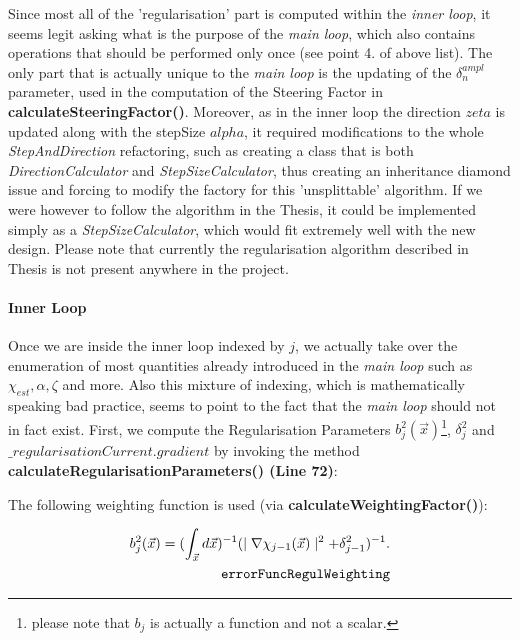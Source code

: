 \documentclass[10pt,a4paper]{article}
\begin{document}
{
Since most all of the 'regularisation' part is computed within the \textit{inner loop}, it seems legit asking what is the purpose of the \textit{main loop}, which also contains operations that should be performed only once (see point 4. of above list).
The only part that is actually unique to the \textit{main loop} is the updating of the $\delta^{ampl}_n$ parameter, used in the computation of the Steering Factor in \textbf{calculateSteeringFactor()}.
\newline
Moreover, as in the inner loop the direction $zeta$ is updated along with the stepSize $alpha$, it required modifications to the whole \textit{StepAndDirection} refactoring, such as creating a class that is both \textit{DirectionCalculator} and \textit{StepSizeCalculator}, thus creating an inheritance diamond issue and forcing to modify the factory for this 'unsplittable' algorithm.
If we were however to follow the algorithm in the Thesis, it could be implemented simply as a \textit{StepSizeCalculator}, which would fit extremely well with the new design.
Please note that currently the regularisation algorithm described in Thesis is not present anywhere in the project.
\newline
}

{
\paragraph{Inner Loop}
Once we are inside the inner loop indexed by $j$, we actually take over the enumeration of most quantities already introduced in the \textit{main loop} such as $\chi_{est}, \alpha, \zeta$ and more. Also this mixture of indexing, which is mathematically speaking bad practice, seems to point to the fact that the \textit{main loop} should not in fact exist.
\newline
First, we compute the Regularisation Parameters $b^2_j(\vec{x})$\footnote{please note that $b_j$ is actually a function and not a scalar.}, $\delta^2_j$  and $\_regularisationCurrent.gradient$ by invoking the method \textbf{calculateRegularisationParameters() (Line 72)}:
}

The following weighting function is used {(via \textbf{calculateWeightingFactor()})}:

\begin{align} \label{eq:errorFuncRegulWeighting} b_j^{2}(\vec{x}) = (\int_{\vec{x}}
d\vec{x})^{-1} (\mid\nabla\chi_{j-1}(\vec{x})\mid^2 + \delta_{j-1}^2)^{-1}.\\
\tag*{\texttt{errorFuncRegulWeighting}}
\end{align}
\end{document}
